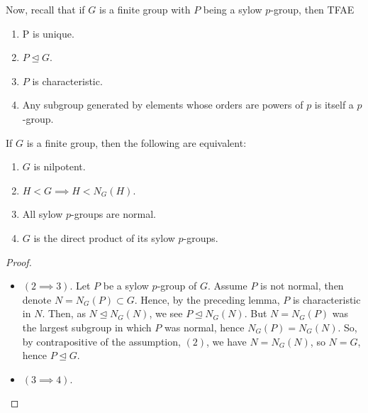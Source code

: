 Now, recall that if \(G\) is a finite group with \(P\) being a sylow \(p\)-group, then TFAE
\begin{enumerate}
	\item P is unique.
	\item \(P \trianglelefteq G\).
	\item \(P\) is characteristic.
	\item Any subgroup generated by elements whose orders are powers of \(p\) is itself a \(p\)-group.
\end{enumerate}
\begin{theorem}
	If \(G\) is a finite group, then the following are equivalent:
	\begin{enumerate}
		\item \(G\) is nilpotent.
		\item \(H < G \implies H < N_{G}\left( H \right) \).
		\item All sylow \(p\)-groups are normal.
		\item \(G\) is the direct product of its sylow \(p\)-groups.
	\end{enumerate}
\end{theorem}
\begin{proof}
	\begin{itemize}
		\item \(\left( 2\implies 3 \right) \). Let \(P\) be a sylow \(p\)-group of \(G\). Assume \(P\) is not normal, then denote \(N = N_{G}\left( P \right) \subset G\). Hence, by the preceding lemma, \(P\) is characteristic in \(N\). Then, as \(N \trianglelefteq N_{G}\left( N \right) \), we see \(P \trianglelefteq N_G\left( N \right) \). But \(N = N_{G}\left( P \right) \) was the largest subgroup in which \(P\) was normal, hence \(N_{G}\left( P \right) = N_{G}\left( N \right) \). So, by contrapositive of the assumption, \((2)\), we have \(N  = N_{G}\left( N \right) \), so \(N = G\), hence \(P \trianglelefteq G\).
		\item \(\left( 3 \implies 4 \right) \).
	\end{itemize}

\end{proof}
